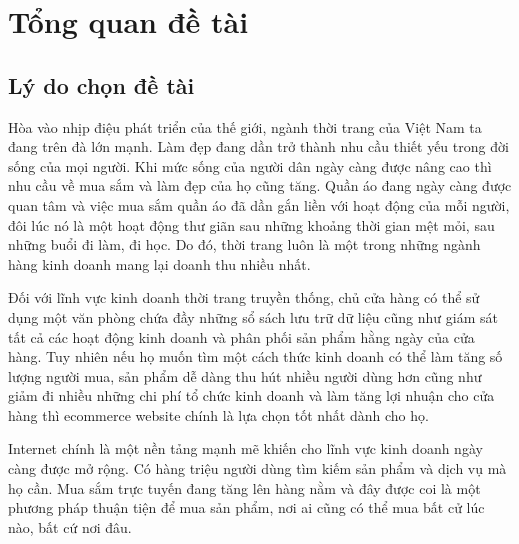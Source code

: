 \documentclass[12pt,a4paper,2sides]{report}
\begin{document}
\newpage
\clearpage
\dominitoc
\tableofcontents %
\newpage
\clearpage
\clearpage
{}
\setcounter{page}{1}
\clearpage
%



\newpage
\chapter{Tổng quan đề tài}
\section{Lý do chọn đề tài} 
Hòa vào nhịp điệu phát triển của thế giới, ngành thời trang của Việt Nam ta đang trên đà lớn mạnh. Làm đẹp đang dần trở thành nhu cầu thiết yếu trong đời sống của mọi người. Khi mức sống của người dân ngày càng được nâng cao thì nhu cầu về mua sắm và làm đẹp của họ cũng tăng. Quần áo đang ngày càng được quan tâm và việc mua sắm quần áo đã dần gắn liền với hoạt động của mỗi người, đôi lúc nó là một hoạt động thư giãn sau những khoảng thời gian mệt mỏi, sau những buổi đi làm, đi học. Do đó, thời trang luôn là một trong những ngành hàng kinh doanh mang lại doanh thu nhiều nhất.

Đối với lĩnh vực kinh doanh thời trang truyền thống, chủ cửa hàng có thể sử dụng một văn phòng chứa đầy những sổ sách lưu trữ dữ liệu cũng như giám sát tất cả các hoạt động kinh doanh và phân phối sản phẩm hằng ngày của cửa hàng. Tuy nhiên nếu họ muốn tìm một cách thức kinh doanh có thể làm tăng số lượng người mua, sản phẩm dễ dàng thu hút nhiều người dùng hơn cũng như giảm đi nhiều những chi phí tổ chức kinh doanh và làm tăng lợi nhuận cho cửa hàng thì ecommerce website chính là lựa chọn tốt nhất dành cho họ.

Internet chính là một nền tảng mạnh mẽ khiến cho lĩnh vực kinh doanh ngày càng được mở rộng. Có hàng triệu người dùng tìm kiếm sản phẩm và dịch vụ mà họ cần. Mua sắm trực tuyến đang tăng lên hàng nằm và đây được coi là một phương pháp thuận tiện để mua sản phẩm, nơi ai cũng có thể mua bất cử lúc nào, bất cứ nơi đâu.
\end{document}
